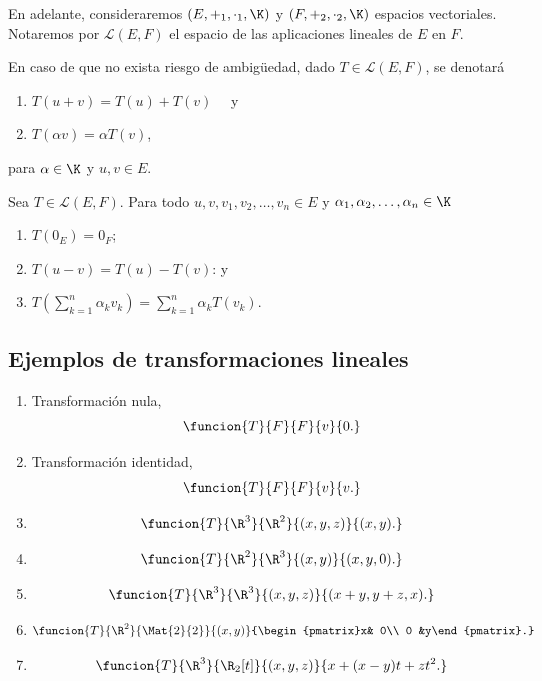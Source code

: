 \documentclass[a4,11pt]{aleph-notas}
\begin{document}
En adelante, consideraremos $(E,+_1,\cdot_1,\K)$ y $(F,+_2,\cdot_2,\K)$ espacios vectoriales. Notaremos por $\mathcal{L}(E,F)$ el espacio de las aplicaciones lineales de $E$ en $F$.

\begin{advertencia}
    En caso de que no exista riesgo de ambigüedad, dado $T \in \mathcal{L}(E,F)$, se denotará
    \begin{enumerate}
    \item 
        $T(u + v) = T(u) + T(v)\quad$ y
    \item 
        $T(\alpha v ) = \alpha T(v)$,
    \end{enumerate}
    para $\alpha \in \K$ y $u,v \in E$.
\end{advertencia}
    
\begin{teo}
     Sea $T \in \mathcal{L}(E,F)$. Para todo $u,v, v_1, v_2, \ldots, v_n \in E$ y $\alpha_1, \alpha_2, \ldots, \alpha_n \in \K$
     \begin{enumerate}
         \item $T(0_E) = 0_F$;
         \item $T(u-v) = T(u) - T(v)$: y
         \item $T\left(\displaystyle \sum_{k=1}^n \alpha_k v_k \right)= 
         \displaystyle \sum_{k=1}^n \alpha_k T\left(v_k \right)$.
     \end{enumerate}
\end{teo}

\subsection{Ejemplos de transformaciones lineales}
\begin{enumerate}
\item 
    Transformación nula, \[\funcion{T}{F}{F}{v}{0.}\]
\item 
    Transformación identidad, \[\funcion{T}{F}{F}{v}{v.}\]
\item 
    \[
        \funcion{T}{\R^3}{\R^2}
            {(x,y,z)}{(x, y).}
    \]
\item 
    \[
        \funcion{T}{\R^2}{\R^3}
            {(x,y)}{(x, y,0).}
    \]
\item 
    \[
        \funcion{T}{\R^3}{\R^3}
            {(x,y,z)}{(x+y, y + z,x).}
    \]
\item 
    \[
        \funcion{T}{\R^2}{\Mat{2}{2}}
            {(x,y)}{\begin{pmatrix}x& 0\\ 0 &y\end{pmatrix}.}
    \]
\item 
    \[
        \funcion{T}{\R^3}{\R_2[t]}
            {(x,y,z)}{x+(x-y)t + zt^2.}
    \]
\end{enumerate}
\end{document}
